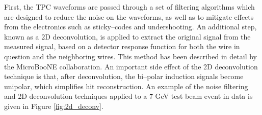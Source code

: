 First, the TPC waveforms are passed through a set of filtering algorithms which
are designed to reduce the noise on the waveforms, as well as to mitigate 
effects from the electronics such as sticky--codes and undershooting. An 
additional step, known as a 2D deconvolution, is applied to extract the original
signal from the measured signal, based on a detector response function for 
both the wire in question and the neighboring wires. This method has been 
described in detail by the MicroBooNE collaboration\cite{Adams:2018dra}. An 
important side effect of the 2D deconvolution technique is that, after 
deconvolution, the bi--polar induction signals become unipolar, which 
simplifies hit reconstruction. An example of the noise filtering and 2D 
deconvolution techniques applied to a 7 GeV test beam event in \protodune{} 
data is given in Figure \ref{fig:2d_deconv}. 

